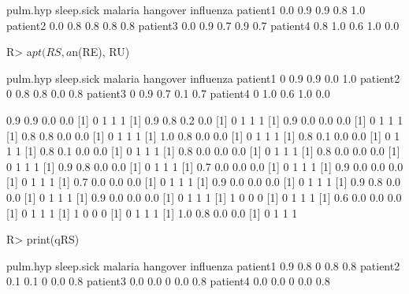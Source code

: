 \documentclass{article}\usepackage[]{graphicx}\usepackage[]{color}
\begin{document}
\begin{Schunk}
% --begin: "comp.circ.unavoid"
\begin{Soutput}
         pulm.hyp sleep.sick malaria hangover influenza
patient1      0.0        0.9     0.9      0.8       1.0
patient2      0.0        0.8     0.8      0.8       0.8
patient3      0.0        0.9     0.7      0.9       0.7
patient4      0.8        1.0     0.6      1.0       0.0
\end{Soutput}
%
% --end: "comp.circ.unavoid"
\end{Schunk}

\begin{Schunk}
% --begin: "comp.circ.excl.unavoid"
\begin{Sinput}
R> a$pt(RS, a$n(RE), RU)
\end{Sinput}
\begin{Soutput}
         pulm.hyp sleep.sick malaria hangover influenza
patient1        0        0.9     0.9      0.0       1.0
patient2        0        0.8     0.8      0.0       0.8
patient3        0        0.9     0.7      0.1       0.7
patient4        0        1.0     0.6      1.0       0.0
\end{Soutput}
%
% --end: "comp.circ.excl.unavoid"
\end{Schunk}

\begin{Schunk}
% --begin: "comp.quant.atleast"
\begin{Soutput}
[1] 0.9 0.9 0.0 0.0
[1] 0 1 1 1
[1] 0.9 0.8 0.2 0.0
[1] 0 1 1 1
[1] 0.9 0.0 0.0 0.0
[1] 0 1 1 1
[1] 0.8 0.8 0.0 0.0
[1] 0 1 1 1
[1] 1.0 0.8 0.0 0.0
[1] 0 1 1 1
[1] 0.8 0.1 0.0 0.0
[1] 0 1 1 1
[1] 0.8 0.1 0.0 0.0
[1] 0 1 1 1
[1] 0.8 0.0 0.0 0.0
[1] 0 1 1 1
[1] 0.8 0.0 0.0 0.0
[1] 0 1 1 1
[1] 0.9 0.8 0.0 0.0
[1] 0 1 1 1
[1] 0.7 0.0 0.0 0.0
[1] 0 1 1 1
[1] 0.9 0.0 0.0 0.0
[1] 0 1 1 1
[1] 0.7 0.0 0.0 0.0
[1] 0 1 1 1
[1] 0.9 0.0 0.0 0.0
[1] 0 1 1 1
[1] 0.9 0.8 0.0 0.0
[1] 0 1 1 1
[1] 0.9 0.0 0.0 0.0
[1] 0 1 1 1
[1] 1 0 0 0
[1] 0 1 1 1
[1] 0.6 0.0 0.0 0.0
[1] 0 1 1 1
[1] 1 0 0 0
[1] 0 1 1 1
[1] 1.0 0.8 0.0 0.0
[1] 0 1 1 1
\end{Soutput}
\begin{Sinput}
R> print(qRS)
\end{Sinput}
\begin{Soutput}
         pulm.hyp sleep.sick malaria hangover influenza
patient1      0.9        0.8       0      0.8       0.8
patient2      0.1        0.1       0      0.0       0.8
patient3      0.0        0.0       0      0.0       0.8
patient4      0.0        0.0       0      0.0       0.8
\end{Soutput}
%
% --end: "comp.quant.atleast"
\end{Schunk}
\end{document}
